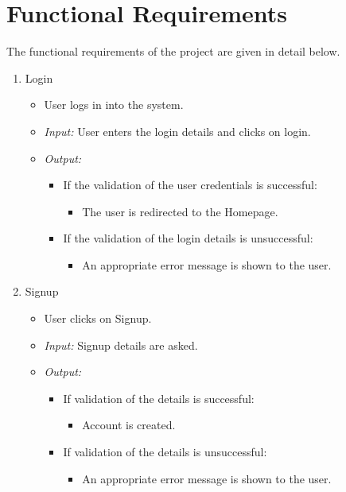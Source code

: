 \documentclass[11pt]{report} %
\begin{document}
\section{Functional Requirements}
The functional requirements of the project are given in detail below.
\begin{enumerate}
	\item
		Login
		\begin{itemize}
			\item
				User logs in into the system.
			\item
				\emph{Input:} User enters the login details and clicks on login.
			\item
				\emph{Output:} 
					\begin{itemize}
						\item
							If the validation of the user credentials is successful:
							\begin{itemize}
								\item
									The user is redirected to the Homepage.
							\end{itemize}


						\item
							If the validation of the login details is unsuccessful:
							\begin{itemize}
								\item
									An appropriate error message is shown to the user.
							\end{itemize}
					\end{itemize}
		\end{itemize}

	\item
		Signup
		\begin{itemize}
			\item
				User clicks on Signup.
			\item
				\emph{Input:} Signup details are asked.
			\item
				\emph{Output:} 
					\begin{itemize}
						\item	
							If validation of the details is successful:
							\begin{itemize}
								\item
									Account is created.
							\end{itemize}

						\item
							If validation of the details is unsuccessful:
							\begin{itemize}
								\item
									An appropriate error message is shown to the user.
							\end{itemize}
					\end{itemize}
		\end{itemize}


\end{enumerate}
\end{document}
